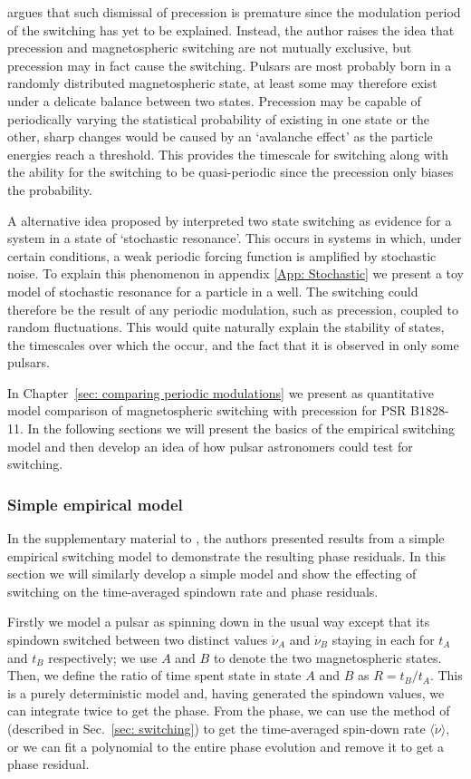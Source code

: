 \citet{Jones2012} argues that such dismissal of precession is premature since
the modulation period of the switching has yet to be explained.  Instead, the
author raises the idea that precession and magnetospheric switching are not
mutually exclusive, but precession may in fact cause the switching. Pulsars are
most probably born in a randomly distributed magnetospheric state, at least
some may therefore exist under a delicate balance between two states.
Precession may be capable of periodically varying the statistical probability
of existing in one state or the other, sharp changes would be caused by an
`avalanche effect' as the particle energies reach a threshold.  This provides
the timescale for switching along with the ability for the switching to be
quasi-periodic since the precession only biases the probability.

A alternative idea proposed by \citet{Cordes2013} interpreted two state
switching as evidence for a system in a state of `stochastic resonance'.  This
occurs in systems in which, under certain conditions, a weak periodic forcing
function is amplified by stochastic noise. To explain this phenomenon in
appendix \ref{App: Stochastic} we present a toy model of stochastic resonance
for a particle in a well. The switching could therefore be the result of any
periodic modulation, such as precession, coupled to random fluctuations. This
would quite naturally explain the stability of states, the timescales over
which the occur, and the fact that it is observed in only some pulsars.

In Chapter~\ref{sec: comparing periodic modulations} we present as quantitative
model comparison of magnetospheric switching with precession for PSR B1828-11.
In the following sections we will present the basics of the empirical switching
model and then develop an idea of how pulsar astronomers could test for switching.

\subsubsection{Simple empirical model}

In the supplementary material to \citet{Lyne2010}, the authors presented
results from a simple empirical switching model to demonstrate the resulting
phase residuals. In this section we will similarly develop a simple model and
show the effecting of switching on the time-averaged spindown rate and phase
residuals.

Firstly we model a pulsar as spinning down in the usual way except that its
spindown switched between two distinct values $\dot{\nu}_{A}$ and $\dot{\nu}_{B}$
staying in each for $t_A$ and $t_B$ respectively; we use
$A$ and $B$ to denote the two magnetospheric states. Then, we
define the ratio of time spent state in state $A$ and $B$ as $R =
t_{B}/t_{A}$.  This is a purely deterministic model and, having generated the
spindown values, we can integrate twice to get the phase. From the phase, we can
use the method of \citet{Lyne2010} (described in Sec.~\ref{sec: switching})
to get the time-averaged spin-down rate $\langle\dot{\nu}\rangle$, or we can
fit a polynomial to the entire phase evolution and remove it to get a phase
residual.

